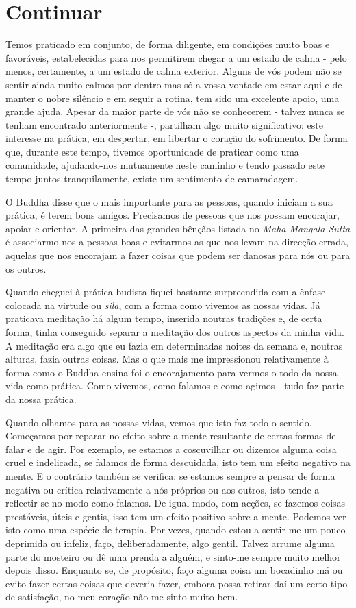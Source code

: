 \chapter{Continuar}

Temos praticado em conjunto, de forma diligente, em condições muito boas
e favoráveis, estabelecidas para nos permitirem chegar a um estado de
calma - pelo menos, certamente, a um estado de calma exterior. Alguns de
vós podem não se sentir ainda muito calmos por dentro mas só a vossa
vontade em estar aqui e de manter o nobre silêncio e em seguir a rotina,
tem sido um excelente apoio, uma grande ajuda. Apesar da maior parte de
vós não se conhecerem - talvez nunca se tenham encontrado anteriormente
-, partilham algo muito significativo: este interesse na prática, em
despertar, em libertar o coração do sofrimento. De forma que, durante
este tempo, tivemos oportunidade de praticar como uma comunidade,
ajudando-nos mutuamente neste caminho e tendo passado este tempo juntos
tranquilamente, existe um sentimento de camaradagem.

O Buddha disse que o mais importante para as pessoas, quando iniciam a
sua prática, é terem bons amigos. Precisamos de pessoas que nos possam
encorajar, apoiar e orientar. A primeira das grandes bênçãos listada no
\emph{Maha Mangala Sutta} é associarmo-nos a pessoas boas e evitarmos as
que nos levam na direcção errada, aquelas que nos encorajam a fazer
coisas que podem ser danosas para nós ou para os outros.

Quando cheguei à prática budista fiquei bastante surpreendida com a
ênfase colocada na virtude ou \emph{sila}, com a forma como vivemos as
nossas vidas. Já praticava meditação há algum tempo, inserida noutras
tradições e, de certa forma, tinha conseguido separar a meditação dos
outros aspectos da minha vida. A meditação era algo que eu fazia em
determinadas noites da semana e, noutras alturas, fazia outras coisas.
Mas o que mais me impressionou relativamente à forma como o Buddha
ensina foi o encorajamento para vermos o todo da nossa vida como
prática. Como vivemos, como falamos e como agimos - tudo faz parte da
nossa prática.

Quando olhamos para as nossas vidas, vemos que isto faz todo o sentido.
Começamos por reparar no efeito sobre a mente resultante de certas
formas de falar e de agir. Por exemplo, se estamos a coscuvilhar ou
dizemos alguma coisa cruel e indelicada, se falamos de forma descuidada,
isto tem um efeito negativo na mente. E o contrário também se verifica:
se estamos sempre a pensar de forma negativa ou crítica relativamente a
nós próprios ou aos outros, isto tende a reflectir-se no modo como
falamos. De igual modo, com acções, se fazemos coisas prestáveis, úteis
e gentis, isso tem um efeito positivo sobre a mente. Podemos ver isto
como uma espécie de terapia. Por vezes, quando estou a sentir-me um
pouco deprimida ou infeliz, faço, deliberadamente, algo gentil. Talvez
arrume alguma parte do mosteiro ou dê uma prenda a alguém, e sinto-me
sempre muito melhor depois disso. Enquanto se, de propósito, faço alguma
coisa um bocadinho má ou evito fazer certas coisas que deveria fazer,
embora possa retirar daí um certo tipo de satisfação, no meu coração não
me sinto muito bem.


